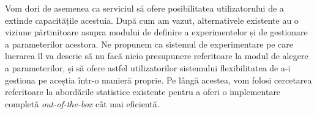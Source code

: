 Vom dori de asemenea ca serviciul să ofere posibilitatea utilizatorului de a extinde capacitățile acestuia. După cum am vazut, alternativele existente au o viziune părtinitoare asupra modului de definire a experimentelor și de gestionare a parameterilor acestora. Ne propunem ca sistemul de experimentare pe care lucrarea îl va descrie să nu facă nicio presupunere referitoare la modul de alegere a parameterilor, și să ofere astfel utilizatorilor sistemului flexibilitatea de a-i gestiona pe aceștia într-o manieră proprie. Pe lângă acestea, vom folosi cercetarea referitoare la abordările statistice existente pentru a oferi o implementare completă \textit{out-of-the-box} cât mai eficientă.


